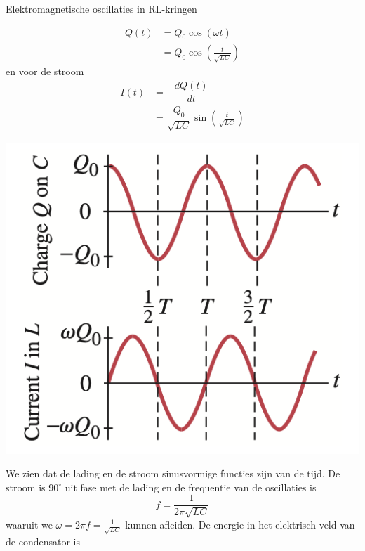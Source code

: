 \begin{app}{Elektromagnetische oscillaties in RL-kringen}
    \begin{minipage}{.71\textwidth}
        \begin{align*}
            Q(t) &= Q_{0}\cos(\omega t) \\
                 &= Q_{0}\cos(\tfrac{t}{\sqrt{LC}})
        \end{align*}
        \hspace{-0.6cm} en voor de stroom
        \begin{align*}
            I(t) &= -\dfrac{dQ(t)}{dt} \\
                 &= \dfrac{Q_{0}}{\sqrt{LC}}\sin(\tfrac{t}{\sqrt{LC}})
        \end{align*}
    \end{minipage}
    \begin{minipage}{.25\textwidth}
        \vspace{0.3cm}\hspace{-0.45cm}\includegraphics[scale = 0.45]{Images/Magnetisme/LCKringGrafiek}
    \end{minipage}
    We zien dat de lading en de stroom sinusvormige functies zijn van de tijd. De stroom is $90^{\circ}$ uit fase met de lading en de frequentie van de oscillaties is
    \begin{equation*}
        f = \dfrac{1}{2\pi\sqrt{LC}}
    \end{equation*}
    waaruit we $\omega = 2\pi f = \tfrac{1}{\sqrt{LC}}$ kunnen afleiden. De energie in het elektrisch veld van de condensator is


\end{app}
